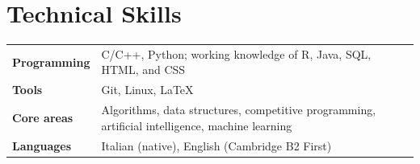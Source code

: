 \section{Technical Skills}
\begin{tabularx}{\textwidth}{@{}>{\bfseries}p{3.3cm}X@{}}
Programming & C/C++, Python; working knowledge of R, Java, SQL, HTML, and CSS \\
Tools & Git, Linux, \LaTeX \\
Core areas & Algorithms, data structures, competitive programming, artificial intelligence, machine learning \\
Languages & Italian (native), English (Cambridge B2 First) \\
\end{tabularx}
